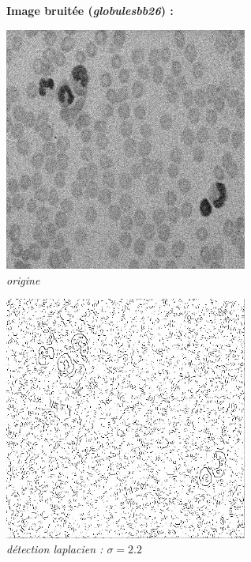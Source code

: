 \documentclass[a4,12pt]{article}
\begin{document}
\textbf{Image bruitée (\textit{globulesbb26}) :}

\begin{center}
	\begin{minipage}[c]{0.49\linewidth}
		\begin{center}
			\includegraphics[width = 80mm]{./img/globulesbb26.jpg}\\
			\textit{origine}\\
		\end{center}
	\end{minipage}
	\begin{minipage}[c]{0.49\linewidth}
		\begin{center}
			\includegraphics[width = 80mm]{./img/ctrglobulesbb26-2_2.jpg}\\
			\textit{détection laplacien : $\sigma = 2.2$}\\
		\end{center}
	\end{minipage}
\end{center}
\end{document}
